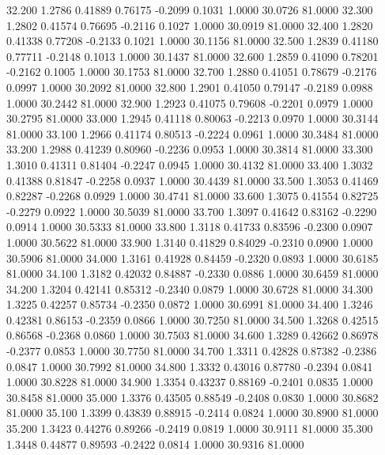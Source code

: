   32.200   1.2786   0.41889   0.76175  -0.2099   0.1031   1.0000  30.0726  81.0000
  32.300   1.2802   0.41574   0.76695  -0.2116   0.1027   1.0000  30.0919  81.0000
  32.400   1.2820   0.41338   0.77208  -0.2133   0.1021   1.0000  30.1156  81.0000
  32.500   1.2839   0.41180   0.77711  -0.2148   0.1013   1.0000  30.1437  81.0000
  32.600   1.2859   0.41090   0.78201  -0.2162   0.1005   1.0000  30.1753  81.0000
  32.700   1.2880   0.41051   0.78679  -0.2176   0.0997   1.0000  30.2092  81.0000
  32.800   1.2901   0.41050   0.79147  -0.2189   0.0988   1.0000  30.2442  81.0000
  32.900   1.2923   0.41075   0.79608  -0.2201   0.0979   1.0000  30.2795  81.0000
  33.000   1.2945   0.41118   0.80063  -0.2213   0.0970   1.0000  30.3144  81.0000
  33.100   1.2966   0.41174   0.80513  -0.2224   0.0961   1.0000  30.3484  81.0000
  33.200   1.2988   0.41239   0.80960  -0.2236   0.0953   1.0000  30.3814  81.0000
  33.300   1.3010   0.41311   0.81404  -0.2247   0.0945   1.0000  30.4132  81.0000
  33.400   1.3032   0.41388   0.81847  -0.2258   0.0937   1.0000  30.4439  81.0000
  33.500   1.3053   0.41469   0.82287  -0.2268   0.0929   1.0000  30.4741  81.0000
  33.600   1.3075   0.41554   0.82725  -0.2279   0.0922   1.0000  30.5039  81.0000
  33.700   1.3097   0.41642   0.83162  -0.2290   0.0914   1.0000  30.5333  81.0000
  33.800   1.3118   0.41733   0.83596  -0.2300   0.0907   1.0000  30.5622  81.0000
  33.900   1.3140   0.41829   0.84029  -0.2310   0.0900   1.0000  30.5906  81.0000
  34.000   1.3161   0.41928   0.84459  -0.2320   0.0893   1.0000  30.6185  81.0000
  34.100   1.3182   0.42032   0.84887  -0.2330   0.0886   1.0000  30.6459  81.0000
  34.200   1.3204   0.42141   0.85312  -0.2340   0.0879   1.0000  30.6728  81.0000
  34.300   1.3225   0.42257   0.85734  -0.2350   0.0872   1.0000  30.6991  81.0000
  34.400   1.3246   0.42381   0.86153  -0.2359   0.0866   1.0000  30.7250  81.0000
  34.500   1.3268   0.42515   0.86568  -0.2368   0.0860   1.0000  30.7503  81.0000
  34.600   1.3289   0.42662   0.86978  -0.2377   0.0853   1.0000  30.7750  81.0000
  34.700   1.3311   0.42828   0.87382  -0.2386   0.0847   1.0000  30.7992  81.0000
  34.800   1.3332   0.43016   0.87780  -0.2394   0.0841   1.0000  30.8228  81.0000
  34.900   1.3354   0.43237   0.88169  -0.2401   0.0835   1.0000  30.8458  81.0000
  35.000   1.3376   0.43505   0.88549  -0.2408   0.0830   1.0000  30.8682  81.0000
  35.100   1.3399   0.43839   0.88915  -0.2414   0.0824   1.0000  30.8900  81.0000
  35.200   1.3423   0.44276   0.89266  -0.2419   0.0819   1.0000  30.9111  81.0000
  35.300   1.3448   0.44877   0.89593  -0.2422   0.0814   1.0000  30.9316  81.0000
